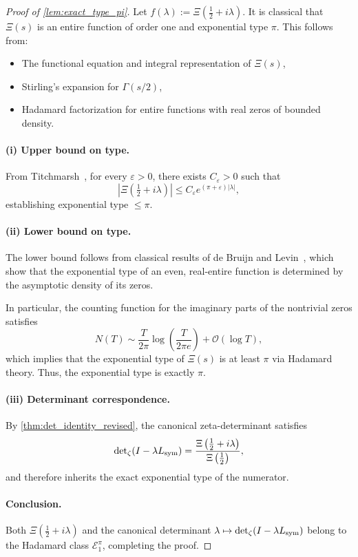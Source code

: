 \begin{proof}[Proof of \cref{lem:exact_type_pi}]
Let \( f(\lambda) := \Xi\left( \tfrac{1}{2} + i\lambda \right) \). It is classical that \( \Xi(s) \) is an entire function of order one and exponential type \( \pi \). This follows from:

\begin{itemize}
  \item The functional equation and integral representation of \( \Xi(s) \),
  \item Stirling’s expansion for \( \Gamma(s/2) \),
  \item Hadamard factorization for entire functions with real zeros of bounded density.
\end{itemize}

\paragraph{(i) Upper bound on type.}
From Titchmarsh~\cite[§10.5]{Titchmarsh1986Zeta}, for every \( \varepsilon > 0 \), there exists \( C_\varepsilon > 0 \) such that
\[
\left| \Xi\left( \tfrac{1}{2} + i\lambda \right) \right| \le C_\varepsilon e^{(\pi + \varepsilon)|\lambda|},
\]
establishing exponential type \( \le \pi \).

\paragraph{(ii) Lower bound on type.}
The lower bound follows from classical results of de Bruijn and Levin~\cite[Ch.~3]{Levin1996EntireLectures}, which show that the exponential type of an even, real-entire function is determined by the asymptotic density of its zeros.

In particular, the counting function for the imaginary parts of the nontrivial zeros satisfies
\[
N(T) \sim \frac{T}{2\pi} \log\left( \frac{T}{2\pi e} \right) + \mathcal{O}(\log T),
\]
which implies that the exponential type of \( \Xi(s) \) is at least \( \pi \) via Hadamard theory. Thus, the exponential type is exactly \( \pi \).

\paragraph{(iii) Determinant correspondence.}
By \cref{thm:det_identity_revised}, the canonical zeta-determinant satisfies
\[
\det\nolimits_\zeta(I - \lambda L_{\mathrm{sym}}) = \frac{\Xi\left( \tfrac{1}{2} + i\lambda \right)}{\Xi\left( \tfrac{1}{2} \right)},
\]
and therefore inherits the exact exponential type of the numerator.

\paragraph{Conclusion.}
Both \( \Xi\left( \tfrac{1}{2} + i\lambda \right) \) and the canonical determinant \( \lambda \mapsto \det\nolimits_\zeta(I - \lambda L_{\mathrm{sym}}) \) belong to the Hadamard class \( \mathcal{E}_1^\pi \), completing the proof.
\end{proof}
